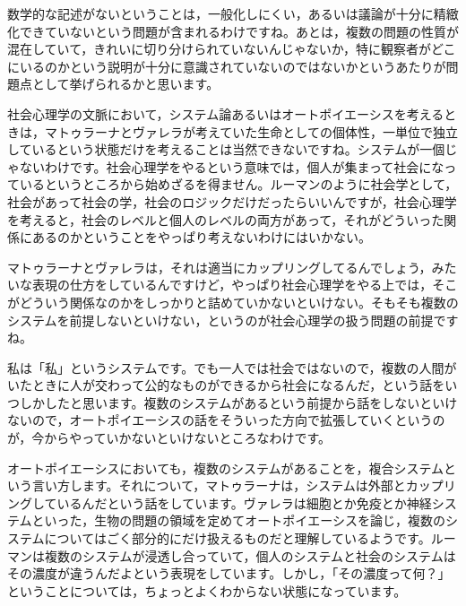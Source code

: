 \documentclass{ltjsbook}
\begin{document}
数学的な記述がないということは，一般化しにくい，あるいは議論が十分に精緻化できていないという問題が含まれるわけですね。あとは，複数の問題の性質が混在していて，きれいに切り分けられていないんじゃないか，特に観察者がどこにいるのかという説明が十分に意識されていないのではないかというあたりが問題点として挙げられるかと思います。

社会心理学の文脈において，システム論あるいはオートポイエーシスを考えるときは，マトゥラーナとヴァレラが考えていた生命としての個体性，一単位で独立しているという状態だけを考えることは当然できないですね。システムが一個じゃないわけです。社会心理学をやるという意味では，個人が集まって社会になっているというところから始めざるを得ません。ルーマンのように社会学として，社会があって社会の学，社会のロジックだけだったらいいんですが，社会心理学を考えると，社会のレベルと個人のレベルの両方があって，それがどういった関係にあるのかということをやっぱり考えないわけにはいかない。

マトゥラーナとヴァレラは，それは適当にカップリングしてるんでしょう，みたいな表現の仕方をしているんですけど，やっぱり社会心理学をやる上では，そこがどういう関係なのかをしっかりと詰めていかないといけない。そもそも複数のシステムを前提しないといけない，というのが社会心理学の扱う問題の前提ですね。

私は「私」というシステムです。でも一人では社会ではないので，複数の人間がいたときに人が交わって公的なものができるから社会になるんだ，という話をいつしかしたと思います。複数のシステムがあるという前提から話をしないといけないので，オートポイエーシスの話をそういった方向で拡張していくというのが，今からやっていかないといけないところなわけです。

オートポイエーシスにおいても，複数のシステムがあることを，複合システムという言い方します。それについて，マトゥラーナは，システムは外部とカップリングしているんだという話をしています。ヴァレラは細胞とか免疫とか神経システムといった，生物の問題の領域を定めてオートポイエーシスを論じ，複数のシステムについてはごく部分的にだけ扱えるものだと理解しているようです。ルーマンは複数のシステムが浸透し合っていて，個人のシステムと社会のシステムはその濃度が違うんだよという表現をしています。しかし，「その濃度って何？」ということについては，ちょっとよくわからない状態になっています。
\end{document}
